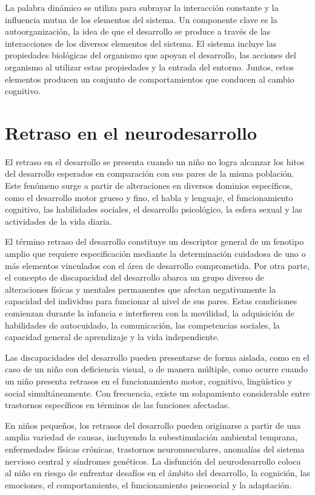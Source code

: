 \documentclass[11pt,letterpaper]{report}
\begin{document}
La palabra dinámico se utiliza para subrayar la interacción constante y la
influencia mutua de los elementos del sistema. Un componente clave es la
autoorganización, la idea de que el desarrollo se produce a través de las
interacciones de los diversos elementos del sistema. El sistema incluye las
propiedades biológicas del organismo que apoyan el desarrollo, las acciones del
organismo al utilizar estas propiedades y la entrada del entorno. Juntos,
estos elementos producen un conjunto de comportamientos que conducen al cambio
cognitivo. \cite{Gauvain2022}

\section{Retraso en el neurodesarrollo}
El retraso en el desarrollo se presenta cuando un niño no logra alcanzar los 
hitos del desarrollo esperados en comparación con sus pares de la misma 
población. Este fenómeno surge a partir de alteraciones en diversos dominios 
específicos, como el desarrollo motor grueso y fino, el habla y lenguaje, el 
funcionamiento cognitivo, las habilidades sociales, el desarrollo psicológico, 
la esfera sexual y las actividades de la vida diaria. \cite{DevelopmentalDelay}

El término retraso del desarrollo constituye un descriptor general de un
fenotipo amplio que requiere especificación mediante la determinación cuidadosa
de uno o más elementos vinculados con el área de desarrollo comprometida.
\cite{DevelopmentalDelay} Por otra parte, el concepto de discapacidad del
desarrollo abarca un grupo diverso de alteraciones físicas y mentales
permanentes que afectan negativamente la capacidad del individuo para funcionar
al nivel de sus pares. Estas condiciones comienzan durante la infancia e
interfieren con la movilidad, la adquisición de habilidades de autocuidado, la
comunicación, las competencias sociales, la capacidad general de aprendizaje y
la vida independiente. \cite{Simms2023}

Las discapacidades del desarrollo pueden presentarse de forma aislada, como en 
el caso de un niño con deficiencia visual, o de manera múltiple, como ocurre 
cuando un niño presenta retrasos en el funcionamiento motor, cognitivo, 
lingüístico y social simultáneamente. Con frecuencia, existe un solapamiento 
considerable entre trastornos específicos en términos de las funciones 
afectadas. \cite{Simms2023}

En niños pequeños, los retrasos del desarrollo pueden originarse a partir de 
una amplia variedad de causas, incluyendo la subestimulación ambiental 
temprana, enfermedades físicas crónicas, trastornos neuromusculares, anomalías 
del sistema nervioso central y síndromes genéticos. \cite{Simms2023} La 
disfunción del neurodesarrollo coloca al niño en riesgo de enfrentar desafíos 
en el ámbito del desarrollo, la cognición, las emociones, el comportamiento, 
el funcionamiento psicosocial y la adaptación.
\end{document}
